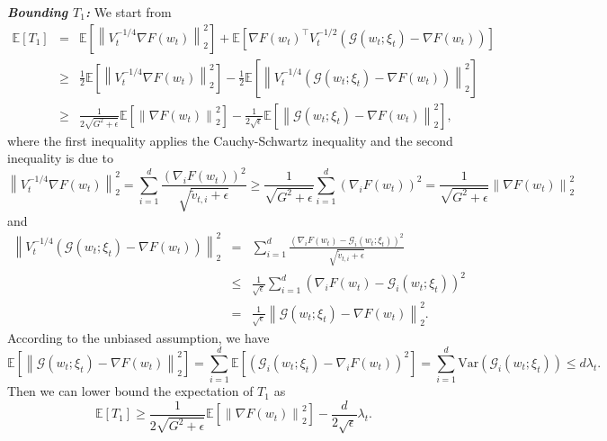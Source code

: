 \documentclass[twoside]{article}
\def\EE{\mathbb{E}}
\def\GG{\mathcal{G}}
\begin{document}
\textbf{\emph{Bounding $T_1$:}} We start from
\begin{eqnarray}
\EE[T_1] &=&  \EE\left[\left\| V_t^{-1/4} \nabla F(w_t)\right\|_2^2 \right] + \EE\left[ \nabla F(w_t) ^\top V_t^{-1/2}(\GG(w_t;\xi_t) - \nabla F(w_t))\right]\nonumber\\
&\geq&  \frac{1}{2}\EE\left[\left\| V_t^{-1/4} \nabla F(w_t)\right\|_2^2 \right]-\frac{1}{2}\EE\left[ \left\| V_t^{-1/4} (\GG(w_t;\xi_t) - \nabla F(w_t))\right\|_2^2\right]\nonumber \\
&\geq& \frac{1}{2\sqrt{G^2+\epsilon}} \EE\left[\left\|\nabla F(w_t)\right\|_2^2\right] - \frac{1}{2\sqrt{\epsilon}} \EE\left[\left\|\GG(w_t;\xi_t) - \nabla F(w_t) \right\|_2^2 \right],\nonumber
\end{eqnarray}
where the first inequality applies the Cauchy-Schwartz inequality and the second inequality is due to
\begin{equation*}
\left\| V_t^{-1/4} \nabla F(w_t)\right\|_2^2 = \sum_{i=1}^d \frac{\left(\nabla_i F(w_t)\right)^2}{\sqrt{\tilde v_{t,i} + \epsilon}} \geq \frac{1}{\sqrt{G^2+\epsilon}} \sum_{i=1}^d \left(\nabla_i F(w_t)\right)^2 = \frac{1}{\sqrt{G^2 + \epsilon}} \left\| \nabla F(w_t)\right\|_2^2
\end{equation*}
and
\begin{eqnarray}
\left\| V_t^{-1/4} (\GG(w_t;\xi_t) - \nabla F(w_t))\right\|_2^2 &=& \sum_{i=1}^d \frac{\left( \nabla_i F(w_t) - \GG_i(w_t;\xi_t)\right)^2}{\sqrt{\tilde v_{t,i} + \epsilon}} \nonumber\\
&\leq& \frac{1}{\sqrt{\epsilon}}\sum_{i=1}^d\left( \nabla_i F(w_t) - \GG_i(w_t;\xi_t)\right)^2 \nonumber\\
&=& \frac{1}{\sqrt{\epsilon}}\left\| \GG(w_t;\xi_t) - \nabla F(w_t)\right\|_2^2.\nonumber
\end{eqnarray}
According to the unbiased assumption, we have
\begin{equation}
\label{BdNorm}
\EE\left[\left\|\GG(w_t;\xi_t) - \nabla F(w_t) \right\|_2^2 \right] = \sum_{i=1}^d \EE\left[(\GG_i(w_t;\xi_t) - \nabla_i F(w_t))^2\right] = \sum_{i=1}^d \mathrm{Var}(\GG_i(w_t;\xi_t)) \leq d\lambda_t.
\end{equation}
Then we can lower bound the expectation of $T_1$ as
\begin{equation}
    \label{MtvT1}
    \EE[T_1] \geq \frac{1}{2\sqrt{G^2+\epsilon}} \EE\left[\left\|\nabla F(w_t)\right\|_2^2\right] - \frac{d}{2\sqrt{\epsilon}}\lambda_t.
\end{equation}
\end{document}
